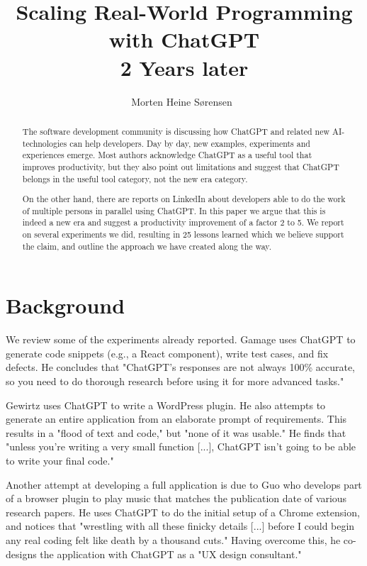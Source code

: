 \documentclass[runningheads]{llncs}
\begin{document}
\title{Scaling Real-World Programming with ChatGPT\\ 2 Years later}
\author{Morten Heine Sørensen\
}
\maketitle              %

\begin{abstract}
 The software development community is discussing how ChatGPT and related new AI-technologies can help developers. Day by day, new examples, experiments and experiences emerge. Most authors acknowledge ChatGPT as a useful tool that improves productivity, but they also point out limitations and suggest that ChatGPT belongs in the useful tool category, not the new era category.

 On the other hand, there are reports on LinkedIn about developers able to do the work of multiple persons in parallel using ChatGPT. In this paper we argue that this is indeed a new era and suggest a productivity improvement of a factor 2 to 5. We report on several experiments we did, resulting in 25 lessons learned which we believe support the claim, and outline the approach we have created along the way.
\keywords{ChatGPT \and Programming \and AI \and Software Development}
\end{abstract}
%
%
%
\section*{Background}
We review some of the experiments already reported. Gamage\cite{Gamage2023} uses ChatGPT to generate code snippets (e.g., a React component), write test cases, and fix defects. He concludes that "ChatGPT's responses are not always 100\% accurate, so you need to do thorough research before using it for more advanced tasks." 

Gewirtz\cite{Gewirtz2023a} uses ChatGPT to write a WordPress plugin. He also attempts to generate an entire application from an elaborate prompt of requirements. This results in a "flood of text and code," but "none of it was usable." He finds that "unless you're writing a very small function [...], ChatGPT isn't going to be able to write your final code." 

Another attempt at developing a full application is due to Guo\cite{Guo2023} who develops part of a browser plugin to play music that matches the publication date of various research papers. He uses ChatGPT to do the initial setup of a Chrome extension, and notices that "wrestling with all these finicky details [...] before I could begin any real coding felt like death by a thousand cuts." Having overcome this, he co-designs the application with ChatGPT as a "UX design consultant." 
\end{document}
